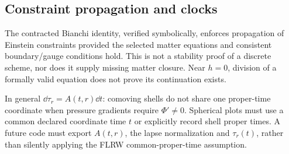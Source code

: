 \subsection{Constraint propagation and clocks}
The contracted Bianchi identity, verified symbolically, enforces propagation of Einstein constraints provided the selected matter equations and consistent boundary/gauge conditions hold. This is not a stability proof of a discrete scheme, nor does it supply missing matter closure. Near $h=0$, division of a formally valid equation does not prove its continuation exists.

In general $\dd\tau_r=A(t,r)\dd t$: comoving shells do not share one proper-time coordinate when pressure gradients require $\Phi'\ne0$. Spherical plots must use a common declared coordinate time $t$ or explicitly record shell proper times. A future code must export $A(t,r)$, the lapse normalization and $\tau_r(t)$, rather than silently applying the FLRW common-proper-time assumption.
